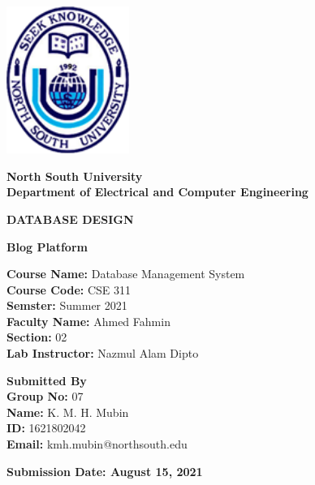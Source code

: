 \documentclass{article}
\begin{document}
\begin{titlepage}
\begin{center}
\includegraphics[width=4cm]{NSU_LOGO.png}
\vspace{0.5cm}

\textbf{\LARGE North South University} \\
\vspace{0.5cm}
\textbf{\Large Department of Electrical and Computer Engineering}\\
\vspace{0.5cm}

\textbf{\MakeUppercase{Database Design}}

\vspace{1cm}

\textbf{\LARGE Blog Platform}

\vspace{0.7cm}
   
\end{center}

\begin{flushleft}

\textbf{Course Name:} Database Management System\\
\textbf{Course Code:} CSE 311\\
\textbf{Semster:} Summer 2021 \\
\textbf{Faculty Name:} Ahmed Fahmin\\
\textbf{Section:} 02\\
\textbf{Lab Instructor:} Nazmul Alam Dipto\\

\vspace{1cm}

\textbf{\large Submitted By}\\
\vspace{0.3cm}
\textbf{Group No:} 07\\
\textbf{Name:} K. M. H. Mubin\\
\textbf{ID:} 1621802042\\
\textbf{Email:} kmh.mubin@northsouth.edu\\

\vspace{1cm}

\end{flushleft}

\vspace*{\fill}
\centering
\textbf{\Large Submission Date: August 15, 2021}

\end{titlepage}
\end{document}
